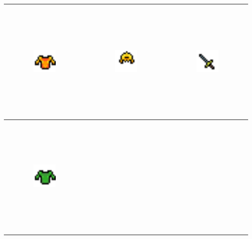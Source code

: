 \begin{table}[h!]
    \begin{center}
    \begin{tabular}{ | c | c | c | }
    \hline
    \includegraphics[width=0.3\textwidth, height=60mm]{images/Entity_Armor_01.png}
    & 
    \includegraphics[width=0.3\textwidth, height=60mm]{images/Entity_Helmet_01.png}    
    & 
    \includegraphics[width=0.3\textwidth, height=60mm]{images/Entity_Weapon_01.png}
    \\
    \hline
    \includegraphics[width=0.3\textwidth, height=60mm]{images/Entity_Armor_02.png}

\end{tabular}
\end{center}
\end{table}
